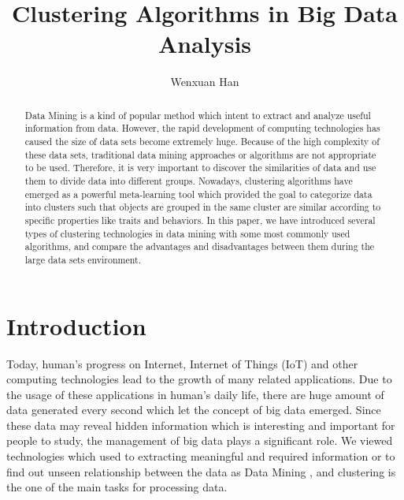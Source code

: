 \documentclass[sigconf]{acmart}
\begin{document}
\title{Clustering Algorithms in Big Data Analysis}


\author{Wenxuan Han}




\begin{abstract}
Data Mining is a kind of popular method which intent to extract and analyze useful information from data. However, the rapid development of computing technologies has caused the size of data sets become extremely huge. Because of the high complexity of these data sets, traditional data mining approaches or algorithms are not appropriate to be used. Therefore, it is very important to discover the similarities of data and use them to divide data into different groups. Nowadays, clustering algorithms have emerged as a powerful meta-learning tool which provided the goal to categorize data into clusters such that objects are grouped in the same cluster are similar according to specific properties like traits and behaviors. In this paper, we have introduced several types of clustering technologies in data mining with some most commonly used algorithms, and compare the advantages and disadvantages between them during the large data sets environment.
\end{abstract}



\maketitle



\section{Introduction}

Today, human's progress on Internet, Internet of Things (IoT) and other computing technologies lead to the growth of many related applications. Due to the usage of these applications in human's daily life, there are huge amount of data generated every second which let the concept of big data emerged. Since these data may reveal hidden information which is interesting and important for people to study, the management of big data plays a significant role. We viewed technologies which used to extracting meaningful and required information or to find out unseen relationship between the data as Data Mining \cite{dcar}, and clustering is the one of the main tasks for processing data.
\end{document}
